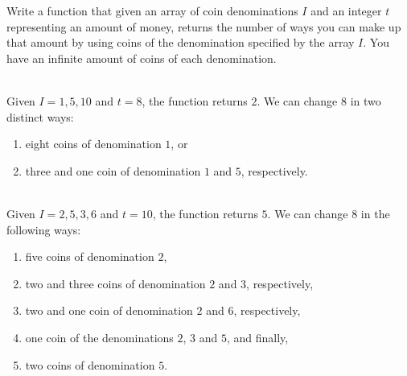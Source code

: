 \begin{exercise}
Write a function that given an array of coin denominations $I$ and an integer $t$ representing an amount of money, returns
the number of ways you can make up that amount by using coins of the denomination specified by the array $I$. 
You have an infinite amount of coins of each denomination. 
		\begin{example}
			\label{ex:coin_change:example1}
			\hfill \\
			Given $I={1,5,10}$ and $t=8$, the function returns $2$.
			We can change $8$ in two distinct ways:
			\begin{enumerate}
				\item eight coins of denomination $1$, or
				\item three and one coin of denomination $1$ and $5$, respectively.
			\end{enumerate}
		\end{example}
	
		\begin{example}
			\hfill \\
			Given $I={2,5,3,6}$ and $t=10$, the function returns $5$.
			We can change $8$ in the following ways:
			\begin{enumerate}
				\item five coins of denomination $2$,
				\item two and three coins of denomination $2$ and $3$, respectively,
				\item two and one coin  of denomination $2$ and $6$, respectively,
				\item one coin of the denominations $2$, $3$ and $5$, and finally,
				\item two coins of denomination $5$.
			\end{enumerate}
		\end{example}
\end{exercise}


